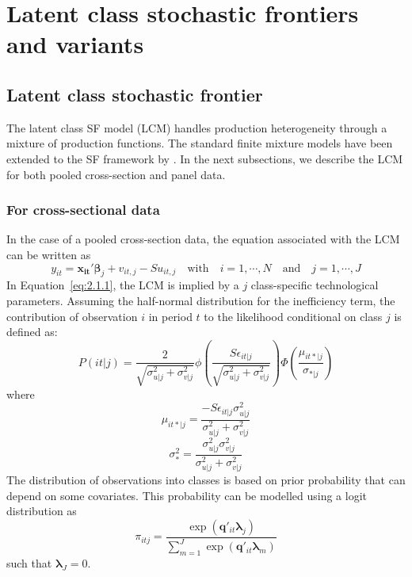 \documentclass[nojss]{jss}
\begin{document}

\section{Latent class stochastic frontiers and variants} \label{sec:modelcm}

\subsection{Latent class stochastic frontier}

The latent class SF model (LCM) handles production heterogeneity
through a mixture of production functions. The standard finite mixture models have
been extended to the SF framework by \citet{cau03, orea04}. In the next subsections, 
we describe the LCM for both pooled cross-section and panel data.

\subsubsection{For cross-sectional data}

In the case of a pooled cross-section data, the equation associated with the LCM can
be written as
%
\begin{equation} \label{eq:2.1.1}
y_{it} = \mathbf{x_{it}'}\bm{\beta}_j + v_{it,j} - Su_{it,j} \quad \text{with} \quad i = 1, \cdots, N \quad \text{and} \quad j = 1, \cdots, J
\end{equation}
%
In Equation~\ref{eq:2.1.1}, the LCM is implied by a $j$ class-specific
technological parameters. Assuming the half-normal distribution for the 
inefficiency term, the contribution of observation $i$ in period $t$ to the 
likelihood conditional on class $j$ is defined as: 
%
\begin{equation}\label{eq:2.1.2}
P(it|j) = \frac{2}{\sqrt{\sigma_{u|j}^2 + 
 \sigma_{v|j}^2}}\phi\left(\frac{S\epsilon_{it|j}}{\sqrt{
 \sigma_{u|j}^2 +\sigma_{v|j}^2}}\right)\Phi\left(\frac{
 \mu_{it*|j}}{\sigma_{*|j}}\right)
\end{equation}
%
where 
%
$$\mu_{it*|j}=\frac{- S\epsilon_{it|j}\sigma_{u|j}^2}{\sigma_{u|j}^2 +
\sigma_{v|j}^2}$$
%
 $$\sigma_*^2 = \frac{\sigma_{u|j}^2 \sigma_{v|j}^2}{\sigma_{u|j}^2 + 
 \sigma_{v|j}^2}$$
%
The distribution of observations into classes is based
on prior probability that can depend on some covariates. This probability can 
be modelled using a logit distribution as
%
\begin{equation} \label{eq:2.1.3}
\pi_{itj} = \frac{\exp{\left(\mathbf{q}'_{it}\bm{\lambda}_j\right)}}{
\sum_{m=1}^J \exp{\left(\mathbf{q}'_{it}\bm{\lambda}_m\right)}
}
\end{equation}
%
such that $\bm{\lambda}_J = 0$. 
\end{document}

